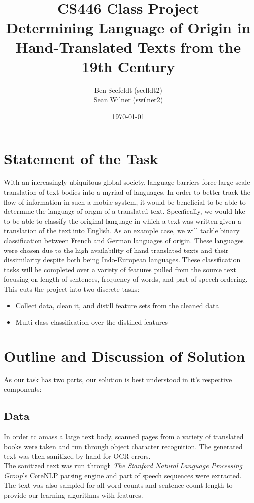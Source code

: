 \documentclass[12pt]{article}
\title { CS446 Class Project\\ \large Determining Language of Origin in Hand-Translated Texts from the 19th Century }
\author{
       Ben Seefeldt (seefldt2)\\
       Sean Wilner (swilner2) \\
}
\date{\today}
\begin{document}
\maketitle

\section{Statement of the Task}
With an increasingly ubiquitous global society, language barriers force large scale translation of text bodies into a myriad of languages.  In order to better track the flow of information in such a mobile system, it would be beneficial to be able to determine the language of origin of a translated text.  Specifically, we would like to be able to classify the original language in which a text was written given a translation of the text into English.   As an example case, we will tackle binary classification between French and German languages of origin.  These languages were chosen due to the high availability of hand translated texts and their dissimilarity despite both being Indo-European languages.  These classiﬁcation tasks will be completed over a variety of features pulled from the source text focusing on length of sentences, frequency of words, and part of speech ordering.\\

This cuts the project into two discrete tasks:
\begin{itemize}
\item Collect data, clean it, and distill feature sets from the cleaned data
\item  Multi-class classiﬁcation over the distilled features
\end{itemize}


\section{Outline and Discussion of Solution}
As our task has two parts, our solution is best understood in it's respective components:
\subsection{Data}
In order to amass a large text body, scanned pages from a variety of translated books were taken and run through object character recognition.  The generated text was then sanitized by hand for OCR errors.\\

The sanitized text was run through {\it The Stanford Natural Language Processing Group}'s CoreNLP parsing engine and part of speech sequences were extracted.  The text was also sampled for all word counts and sentence count length to provide our learning algorithms with features.
\end{document}
